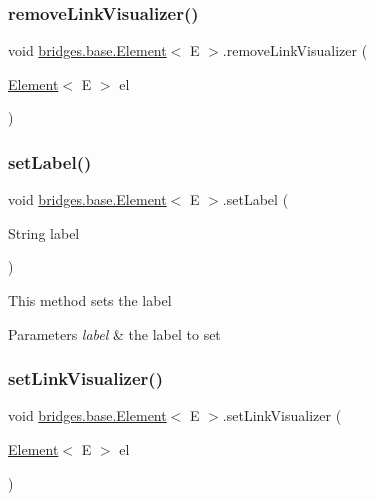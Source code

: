 \subsubsection{\texorpdfstring{remove\+Link\+Visualizer()}{removeLinkVisualizer()}}
{\footnotesize\ttfamily void \mbox{\hyperlink{classbridges_1_1base_1_1_element}{bridges.\+base.\+Element}}$<$ E $>$.remove\+Link\+Visualizer (\begin{DoxyParamCaption}\item[{\mbox{\hyperlink{classbridges_1_1base_1_1_element}{Element}}$<$ E $>$}]{el }\end{DoxyParamCaption})\hspace{0.3cm}{\ttfamily [protected]}}

\mbox{\label{classbridges_1_1base_1_1_element_a942ccd766aeca0c4fdbe27ef8cbe78d9}} 
\subsubsection{\texorpdfstring{set\+Label()}{setLabel()}}
{\footnotesize\ttfamily void \mbox{\hyperlink{classbridges_1_1base_1_1_element}{bridges.\+base.\+Element}}$<$ E $>$.set\+Label (\begin{DoxyParamCaption}\item[{String}]{label }\end{DoxyParamCaption})}

This method sets the label


\begin{DoxyParams}{Parameters}
{\em label} & the label to set \\
\hline
\end{DoxyParams}
\mbox{\label{classbridges_1_1base_1_1_element_af6251f52b9d277dd77e3bab1829d0197}} 
\subsubsection{\texorpdfstring{set\+Link\+Visualizer()}{setLinkVisualizer()}}
{\footnotesize\ttfamily void \mbox{\hyperlink{classbridges_1_1base_1_1_element}{bridges.\+base.\+Element}}$<$ E $>$.set\+Link\+Visualizer (\begin{DoxyParamCaption}\item[{\mbox{\hyperlink{classbridges_1_1base_1_1_element}{Element}}$<$ E $>$}]{el }\end{DoxyParamCaption})\hspace{0.3cm}{\ttfamily [protected]}}

